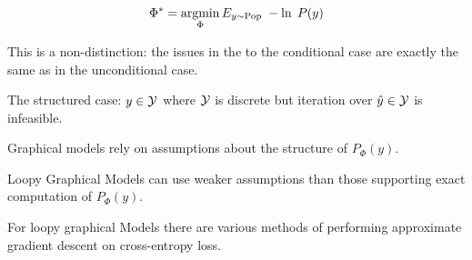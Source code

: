 {\vfill
$$\Phi^* = \operatorname*{argmin}_\Phi E_{y \sim \mathrm{Pop}}\;-\ln \;P(y)$$

\vfill
This is a non-distinction: the issues in the to the conditional case
are exactly the same as in the unconditional case.


The structured case: $y \in {\cal Y}$ where ${\cal Y}$ is discrete but iteration over $\hat{y} \in {\cal Y}$ is infeasible.

\vfill
{\color{red} Graphical models rely on assumptions about the structure of $P_\Phi(y)$.}

\vfill
{\color{red} Loopy Graphical Models can use weaker assumptions than those supporting exact computation of $P_\Phi(y)$.}

\vfill
{\color{red} For loopy graphical Models there are various methods of performing approximate gradient descent on cross-entropy loss.}

}



